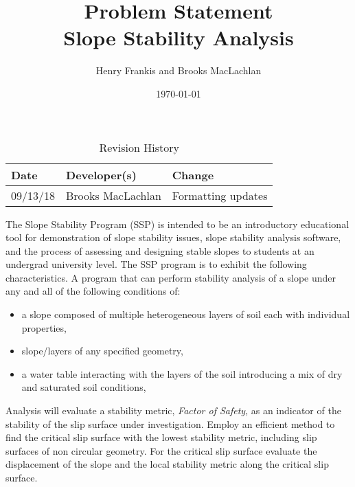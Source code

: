 \documentclass[12pt]{article}
\title{Problem Statement\\Slope Stability Analysis}
\author{Henry Frankis and Brooks MacLachlan}
\date{\today}
\begin{document}
\maketitle

\begin{table}[hp]
	\caption{Revision History} \label{TblRevisionHistory}
	\begin{tabularx}{\textwidth}{llX}
		\toprule
		\textbf{Date} & \textbf{Developer(s)} & \textbf{Change}\\
		\midrule
		09/13/18 & Brooks MacLachlan & Formatting updates\\
		\bottomrule
	\end{tabularx}
\end{table}

The Slope Stability Program (SSP) is intended to be
an introductory educational tool for demonstration
of slope stability issues, slope stability analysis 
software, and the process of assessing and
designing stable slopes to students at an undergrad
university level. The SSP program is to exhibit the following
characteristics.  A program that can perform stability
analysis of a slope under any and all of the
following conditions of:

\begin{itemize}
\item {a slope composed of multiple heterogeneous layers of soil each with individual properties,}
\item {slope/layers of any specified geometry,}
\item {a water table interacting with the layers of the soil introducing a mix of dry and saturated soil conditions,}
\end{itemize}

Analysis will evaluate a stability metric, \textit{Factor of Safety},
as an indicator of the stability of the slip surface under
investigation. Employ an efficient method to find the critical slip
surface with the lowest stability metric, including slip surfaces
of non circular geometry. For the critical slip surface evaluate 
the displacement of the slope and the local stability
metric along the critical slip surface.
\end{document}

